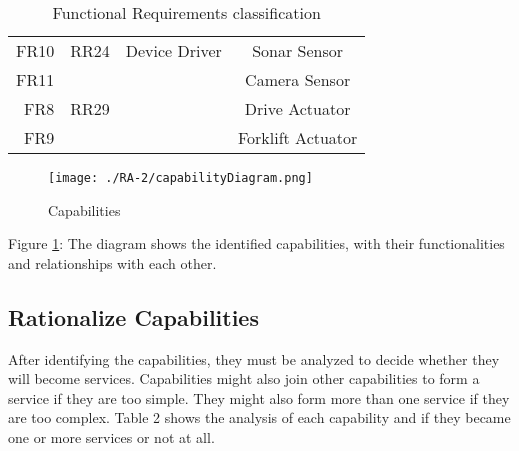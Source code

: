 \begin{table}
\begin{tabular}{| r | p{1.8cm} | c | c |}
		\hline
		FR10 & RR24 & Device Driver & Sonar Sensor\\
		FR11 & 		& 				& Camera Sensor\\
		FR8 & RR29 	& & Drive Actuator\\
		FR9 & 		& & Forklift Actuator\\
	 	\hline
	\end{tabular}
	\caption{Functional Requirements classification}
\end{table}


\begin{figure}[ht!]
 \centering
 \texttt{[image: ./RA-2/capabilityDiagram.png]}
 \caption{Capabilities}
 \label{fig:capabilities}
\end{figure}

Figure \ref{fig:capabilities}: The diagram shows the identified capabilities, with their functionalities and relationships with each other.

\subsection{Rationalize Capabilities}
After identifying the capabilities, they must be analyzed to decide whether they will become services. Capabilities might also join other capabilities to form a service if they are too simple. They might also form more than one service if they are too complex. Table 2 shows the analysis of each capability and if they became one or more services or not at all. 

